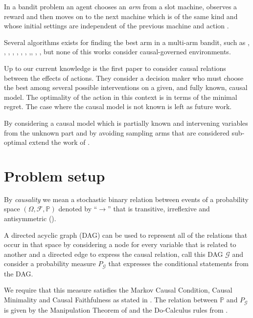 \documentclass{article}
\begin{document}
In a bandit problem an agent chooses an \textit{arm} from a slot machine, observes a reward and then moves on to the next machine which is of the same kind and whose initial settings are independent of the previous machine and action \cite{sutton1998reinforcement}.

Several algorithms exists for finding the best arm in a multi-arm bandit, such as \cite{bubeck2009pure}, \cite{audibert2010best}, \cite{gabillon2012best}, \cite{agarwal2014taming} , \cite{jamieson2014lil},  \cite{jamieson2014best},  \cite{ortega2014generalized}, \cite{chen2015optimal},\cite{carpentier2016tight},  \cite{russo2016simple},  \cite{kaufmann2016complexity}, but none of this works consider causal-governed environments.

Up to our current knowledge \cite{lattimoreNIPS2016} is the first paper to consider causal relations between the effects of actions. They consider a decision maker who must choose the best among several possible interventions on a given, and fully known, causal model. The optimality of the action in this context is in terms of the minimal regret. The case where the causal model is not known is left as future work.

By considering a causal model which is partially known and intervening variables from the unknown part and by avoiding sampling arms that are considered sub-optimal \cite{sen2017identifying} extend the work of \cite{lattimoreNIPS2016}.

\section{Problem setup}
By \textit{causality} we mean a stochastic binary relation between events of a probability space $(\Omega, \mathcal{F}, \mathbb{P})$ denoted by $“\to”$ that is transitive, irreflexive and antisymmetric (\cite{spirtes2000causation}). 

A directed acyclic graph (DAG) can be used to represent all of the relations that occur in that space by considering a node for every variable that is related to another and a directed edge to express the causal relation, call this DAG $\mathcal{G}$ and consider a probability measure $P_{\mathcal{G}}$ that expresses the conditional statements from the DAG. 

We require that this measure satisfies the Markov Causal Condition, Causal Minimality and Causal Faithfulness as stated in \cite{spirtes2000causation}. The relation between $\mathbb{P}$ and $P_{\mathcal{G}}$ is given by the Manipulation Theorem of \cite{spirtes2000causation} and the Do-Calculus rules from \cite{pearl2009causality}.
\end{document}
